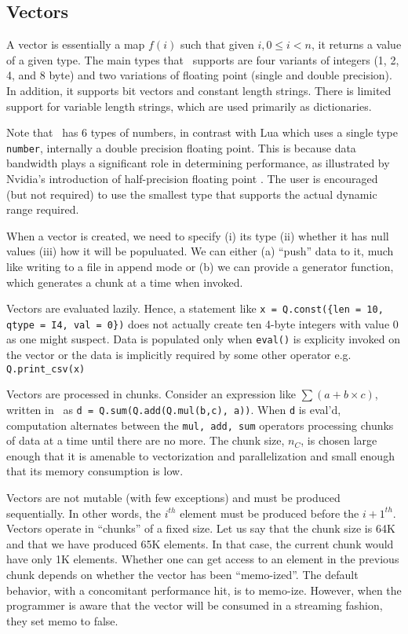 \subsection{Vectors}
\label{Vectors}
A vector is essentially a map \(f(i)\) such that given \(i, 0 \leq i < n\), it
returns a value of a given type. The main types that \Q\ supports are four variants
of integers (1, 2, 4, and 8 byte) and two variations of floating point (single
and double precision). In addition, it supports bit vectors and constant length
strings. There is limited support for variable length strings, which are used
primarily as dictionaries. 

Note that \Q\ has 6 types of numbers, in contrast with Lua which uses a 
single type {\tt number}, internally a double precision floating point.
This is because data bandwidth plays a significant role in determining
performance, as illustrated by Nvidia's
introduction of half-precision floating point  \cite{nvidia2017}. The user is
encouraged (but not required) to use the smallest type that supports the actual
dynamic range required. 


When a vector is created, we need to specify (i) its type (ii) whether it has
null values (iii) how it will be populuated. We can either (a) ``push'' data to
it, much like writing to a file in append mode or (b) we can provide a generator
function, which generates a chunk at a time when invoked.

Vectors are evaluated lazily. Hence, a statement like 
{\tt x = Q.const(\{len = 10, qtype = I4, val = 0\})} does not actually create
ten
4-byte integers with value 0 as one might suspect. Data is populated only when
{\tt eval()} is explicity invoked on the vector or the data is 
implicitly required by some other operator e.g. {\tt Q.print\_csv(x)}

Vectors are processed in chunks. Consider an expression  like \(\sum (a + b\times
c)\), written in \Q\ as {\tt d = Q.sum(Q.add(Q.mul(b,c), a))}.
When {\tt d} is eval'd, computation alternates between the {\tt mul, add, sum}
operators
processing chunks of data at a time until there are
no more.
The chunk size, \(n_C\), is chosen large enough that it is amenable to
vectorization and parallelization and small enough that its memory consumption
is low.


Vectors are not mutable (with few exceptions)
and must be produced sequentially. In other words, the \(i^{th}\) element must
be produced before the \({i+1}^{th}\). Vectors
operate in ``chunks'' of a fixed size. Let us say that the chunk size is 64K and
that we have produced 65K elements. In that case, the current chunk would have
only 1K elements. Whether one can get access to an element in the previous chunk
depends on whether the vector has been ``memo-ized''. The default behavior, with
a concomitant performance hit, is to memo-ize. However, when the programmer is
aware that the vector will be consumed in a streaming fashion, they set memo
to false. 


